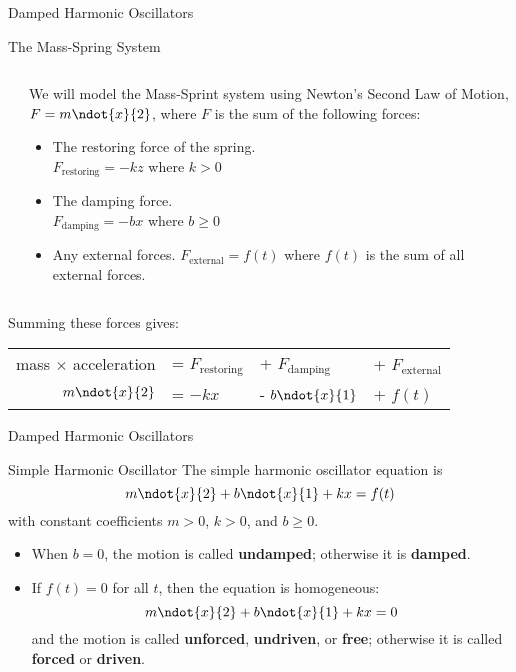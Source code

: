 \documentclass{beamer}
\begin{document}
\begin{frame}{Damped Harmonic Oscillators}
\begin{block}{The Mass-Spring System}
\begin{columns}
\begin{column}{0.4\textwidth}
\end{column}
\begin{column}{0.55\textwidth}
We will model the Mass-Sprint system using Newton's Second Law of Motion, $F=m\ndot{x}{2}$, where $F$ is the sum of the following forces:
\onslide<+->
\begin{itemize}[<+- | alert@+>]
\item The restoring force of the spring. \\ $F_{\text{restoring}}=-kz$ where $k>0$
\item The damping force. \\ $F_{\text{damping}}=-bx$ where $b\geq0$
\item Any external  forces. $F_{\text{external}}=f(t)$ where $f(t)$ is the sum of all external forces.
\end{itemize}
\end{column}
\end{columns}
\onslide<+->
Summing these forces gives:
\begin{tabular}{rlll}
mass $\times$ acceleration &= $F_{\text{restoring}}$ &+ $F_{\text{damping}}$ &+ $F_{\text{external}}$\\
$m\ndot{x}{2}$ &= $-kx$ &- $b\ndot{x}{1}$ &+ $f(t)$
\end{tabular}
\end{block}
\end{frame}

\begin{frame}{Damped Harmonic Oscillators}
\begin{block}{Simple Harmonic Oscillator}
The simple harmonic oscillator equation is
\begin{equation*}
m\ndot{x}{2} +b\ndot{x}{1}+kx=f(t)
\end{equation*}
with constant coefficients $m>0$, $k>0$, and $b\geq 0$.

\onslide<+->
\begin{itemize}[<+- | alert@+>]
\item When $b=0$, the motion is called \textbf{undamped}; otherwise it is \textbf{damped}.
\item If $f(t)=0$ for all $t$, then the equation is homogeneous:
\begin{equation*}
m\ndot{x}{2} +b\ndot{x}{1}+kx=0
\end{equation*}
and the motion is called \textbf{unforced}, \textbf{undriven}, or \textbf{free}; otherwise it is called \textbf{forced} or \textbf{driven}. 
\end{itemize}
\end{block}
\end{frame}
\end{document}
